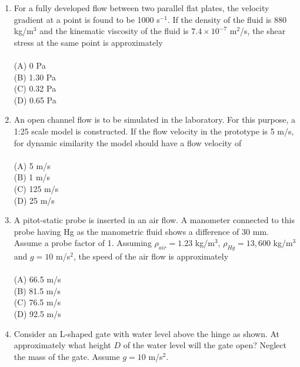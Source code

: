 \documentclass[journal,12pt,onecolumn]{IEEEtran}
\begin{document}
\begin{enumerate}
\item For a fully developed flow between two parallel flat plates, the velocity gradient at a point is found to be 1000 s$^{-1}$. If the density of the fluid is 880 kg/m$^3$ and the kinematic viscosity of the fluid is $7.4 \times 10^{-7}$ m$^2$/s, the shear stress at the same point is approximately\\
\vspace{0.2cm}
\hfill{} \\
(A) 0 Pa\\
(B) 1.30 Pa\\
(C) 0.32 Pa\\
(D) 0.65 Pa
\vspace{0.5cm}

\item An open channel flow is to be simulated in the laboratory. For this purpose, a 1:25 scale model is constructed. If the flow velocity in the prototype is 5 m/s, for dynamic similarity the model should have a flow velocity of\\
\vspace{0.2cm}
\hfill{} \\
(A) 5 m/s\\
(B) 1 m/s\\
(C) 125 m/s\\
(D) 25 m/s
\vspace{0.5cm}


\item A pitot-static probe is inserted in an air flow. A manometer connected to this probe having Hg as the manometric fluid shows a difference of 30 mm. Assume a probe factor of 1. Assuming $\rho_{air} = 1.23$ kg/m$^3$, $\rho_{Hg} = 13,600$ kg/m$^3$ and $g = 10$ m/s$^2$, the speed of the air flow is approximately\\
\vspace{0.2cm}
\hfill{} \\
(A) 66.5 m/s\\
(B) 81.5 m/s\\
(C) 76.5 m/s\\
(D) 92.5 m/s

\newpage

\item Consider an L-shaped gate with water level above the hinge as shown. At approximately what height $D$ of the water level will the gate open? Neglect the mass of the gate. Assume $g = 10$ m/s$^2$.\\


\end{enumerate}
\end{document}
